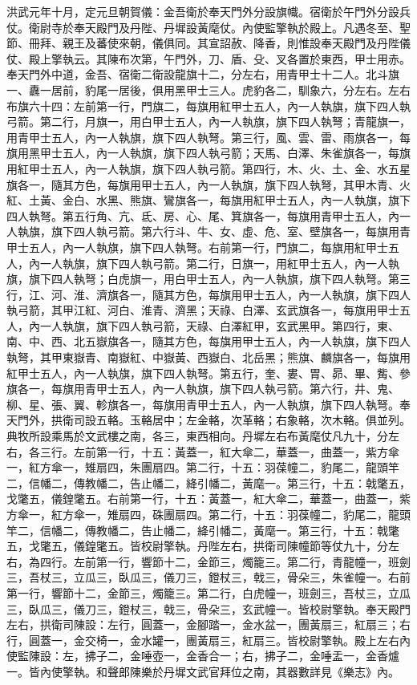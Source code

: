 \begin{pinyinscope}
洪武元年十月，定元旦朝賀儀：金吾衛於奉天門外分設旗幟。宿衛於午門外分設兵仗。衛尉寺於奉天殿門及丹陛、丹墀設黃麾仗。內使監擎執於殿上。凡遇冬至、聖節、冊拜、親王及蕃使來朝，儀俱同。其宣詔赦、降香，則惟設奉天殿門及丹陛儀仗、殿上擎執云。其陳布次第，午門外，刀、盾、殳、叉各置於東西，甲士用赤。奉天門外中道，金吾、宿衛二衛設龍旗十二，分左右，用青甲士十二人。北斗旗一、纛一居前，豹尾一居後，俱用黑甲士三人。虎豹各二，馴象六，分左右。左右布旗六十四：左前第一行，門旗二，每旗用紅甲士五人，內一人執旗，旗下四人執弓箭。第二行，月旗一，用白甲士五人，內一人執旗，旗下四人執弩；青龍旗一，用青甲士五人，內一人執旗，旗下四人執弩。第三行，風、雲、雷、雨旗各一，每旗用黑甲士五人，內一人執旗，旗下四人執弓箭；天馬、白澤、朱雀旗各一，每旗用紅甲士五人，內一人執旗，旗下四人執弓箭。第四行，木、火、土、金、水五星旗各一，隨其方色，每旗用甲士五人，內一人執旗，旗下四人執弩，其甲木青、火紅、土黃、金白、水黑、熊旗、鸞旗各一，每旗用紅甲士五人，內一人執旗，旗下四人執弩。第五行角、亢、氐、房、心、尾、箕旗各一，每旗用青甲士五人，內一人執旗，旗下四人執弓箭。第六行斗、牛、女、虛、危、室、壁旗各一，每旗用青甲士五人，內一人執旗，旗下四人執弩。右前第一行，門旗二，每旗用紅甲士五人，內一人執旗，旗下四人執弓箭。第二行，日旗一，用紅甲士五人，內一人執旗，旗下四人執弩；白虎旗一，用白甲士五人，內一人執旗，旗下四人執弩。第三行，江、河、淮、濟旗各一，隨其方色，每旗用甲士五人，內一人執旗，旗下四人執弓箭，其甲江紅、河白、淮青、濟黑；天祿、白澤、玄武旗各一，每旗用甲士五人，內一人執旗，旗下四人執弓箭，天祿、白澤紅甲，玄武黑甲。第四行，東、南、中、西、北五嶽旗各一，隨其方色，每旗用甲士五人，內一人執旗，旗下四人執弩，其甲東嶽青、南嶽紅、中嶽黃、西嶽白、北岳黑；熊旗、麟旗各一，每旗用紅甲士五人，內一人執旗，旗下四人執弩。第五行，奎、婁、胃、昴、畢、觜、參旗各一，每旗用青甲士五人，內一人執旗，旗下四人執弓箭。第六行，井、鬼、柳、星、張、翼、軫旗各一，每旗用青甲士五人，內一人執旗，旗下四人執弩。奉天門外，拱衛司設五輅。玉輅居中；左金輅，次革輅；右象輅，次木輅。俱並列。典牧所設乘馬於文武樓之南，各三，東西相向。丹墀左右布黃麾仗凡九十，分左右，各三行。左前第一行，十五：黃蓋一，紅大傘二，華蓋一，曲蓋一，紫方傘一，紅方傘一，雉扇四，朱團扇四。第二行，十五：羽葆幢二，豹尾二，龍頭竿二，信幡二，傳教幡二，告止幡二，絳引幡二，黃麾一。第三行，十五：戟氅五，戈氅五，儀鍠氅五。右前第一行，十五：黃蓋一，紅大傘二，華蓋一，曲蓋一，紫方傘一，紅方傘一，雉扇四，硃團扇四。第二行，十五：羽葆幢二，豹尾二，龍頭竿二，信幡二，傳教幡二，告止幡二，絳引幡二，黃麾一。第三行，十五：戟氅五，戈氅五，儀鍠氅五。皆校尉擎執。丹陛左右，拱衛司陳幢節等仗九十，分左右，為四行。左前第一行，響節十二，金節三，燭籠三。第二行，青龍幢一，班劍三，吾杖三，立瓜三，臥瓜三，儀刀三，鐙杖三，戟三，骨朵三，朱雀幢一。右前第一行，響節十二，金節三，燭籠三。第二行，白虎幢一，班劍三，吾杖三，立瓜三，臥瓜三，儀刀三，鐙杖三，戟三，骨朵三，玄武幢一。皆校尉擎執。奉天殿門左右，拱衛司陳設：左行，圓蓋一，金腳踏一，金水盆一，團黃扇三，紅扇三；右行，圓蓋一，金交椅一，金水罐一，團黃扇三，紅扇三。皆校尉擎執。殿上左右內使監陳設：左，拂子二，金唾壺一，金香合一；右，拂子二，金唾盂一，金香爐一。皆內使擎執。和聲郎陳樂於丹墀文武官拜位之南，其器數詳見《樂志》內。


\end{pinyinscope}
